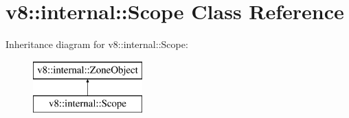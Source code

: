 \hypertarget{classv8_1_1internal_1_1_scope}{}\section{v8\+:\+:internal\+:\+:Scope Class Reference}
\label{classv8_1_1internal_1_1_scope}
Inheritance diagram for v8\+:\+:internal\+:\+:Scope\+:\begin{figure}[H]
\begin{center}
\leavevmode
\includegraphics[height=2.000000cm]{classv8_1_1internal_1_1_scope}
\end{center}
\end{figure}
